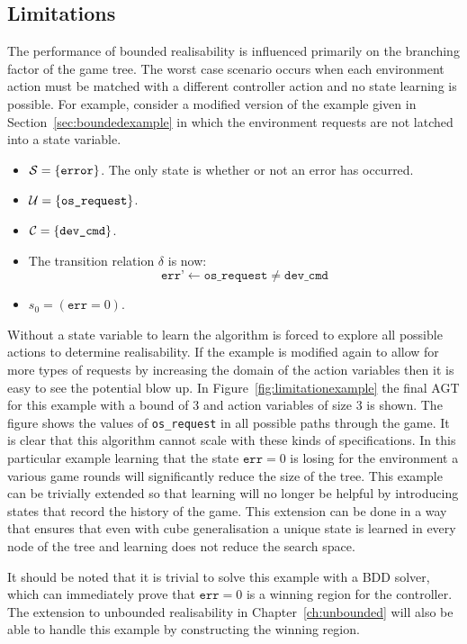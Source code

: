 \subsection{Limitations}

The performance of bounded realisability is influenced primarily on the branching factor of the game tree. The worst case scenario occurs when each environment action must be matched with a different controller action and no state learning is possible. For example, consider a modified version of the example given in Section~\ref{sec:boundedexample} in which the environment requests are not latched into a state variable.

\begin{itemize}
    \item $\mathcal{S} = \{ \texttt{error} \} $. The only state is whether or not an error has occurred. 
    \item $\mathcal{U} = \{ \texttt{os\_request} \} $. 
    \item $\mathcal{C} = \{ \texttt{dev\_cmd} \}$.
    \item The transition relation $\delta$ is now: $$ \texttt{err'} \gets \texttt{os\_request} \neq \texttt{dev\_cmd} $$
    \item $s_0 = (\texttt{err} = 0)$. 
\end{itemize}

Without a state variable to learn the algorithm is forced to explore all possible actions to determine realisability. If the example is modified again to allow for more types of requests by increasing the domain of the action variables then it is easy to see the potential blow up. In Figure~\ref{fig:limitationexample} the final AGT for this example with a bound of $3$ and action variables of size $3$ is shown. The figure shows the values of \texttt{os\_request} in all possible paths through the game. It is clear that this algorithm cannot scale with these kinds of specifications. In this particular example learning that the state $\texttt{err} = 0$ is losing for the environment a various game rounds will significantly reduce the size of the tree. This example can be trivially extended so that learning will no longer be helpful by introducing states that record the history of the game. This extension can be done in a way that ensures that even with cube generalisation a unique state is learned in every node of the tree and learning does not reduce the search space.

It should be noted that it is trivial to solve this example with a BDD solver, which can immediately prove that $\texttt{err} = 0$ is a winning region for the controller. The extension to unbounded realisability in Chapter~\ref{ch:unbounded} will also be able to handle this example by constructing the winning region.

